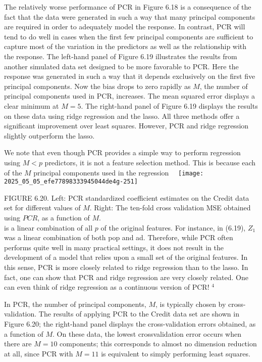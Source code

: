 \documentclass[10pt]{article}
\begin{document}
The relatively worse performance of PCR in Figure 6.18 is a consequence of the fact that the data were generated in such a way that many principal components are required in order to adequately model the response. In contrast, PCR will tend to do well in cases when the first few principal components are sufficient to capture most of the variation in the predictors as well as the relationship with the response. The left-hand panel of Figure 6.19 illustrates the results from another simulated data set designed to be more favorable to PCR. Here the response was generated in such a way that it depends exclusively on the first five principal components. Now the bias drops to zero rapidly as $M$, the number of principal components used in PCR, increases. The mean squared error displays a clear minimum at $M=5$. The right-hand panel of Figure 6.19 displays the results on these data using ridge regression and the lasso. All three methods offer a significant improvement over least squares. However, PCR and ridge regression slightly outperform the lasso.

We note that even though PCR provides a simple way to perform regression using $M<p$ predictors, it is not a feature selection method. This is because each of the $M$ principal components used in the regression\
\
\texttt{[image: 2025\_05\_05\_efe77898333945044de4g-251]}

FIGURE 6.20. Left: PCR standardized coefficient estimates on the Credit data set for different values of $M$. Right: The ten-fold cross validation MSE obtained using $P C R$, as a function of $M$.\\
is a linear combination of all $p$ of the original features. For instance, in (6.19), $Z_{1}$ was a linear combination of both pop and ad. Therefore, while PCR often performs quite well in many practical settings, it does not result in the development of a model that relies upon a small set of the original features. In this sense, PCR is more closely related to ridge regression than to the lasso. In fact, one can show that PCR and ridge regression are very closely related. One can even think of ridge regression as a continuous version of PCR! ${ }^{4}$

In PCR, the number of principal components, $M$, is typically chosen by cross-validation. The results of applying PCR to the Credit data set are shown in Figure 6.20; the right-hand panel displays the cross-validation errors obtained, as a function of $M$. On these data, the lowest crossvalidation error occurs when there are $M=10$ components; this corresponds to almost no dimension reduction at all, since PCR with $M=11$ is equivalent to simply performing least squares.
\end{document}
